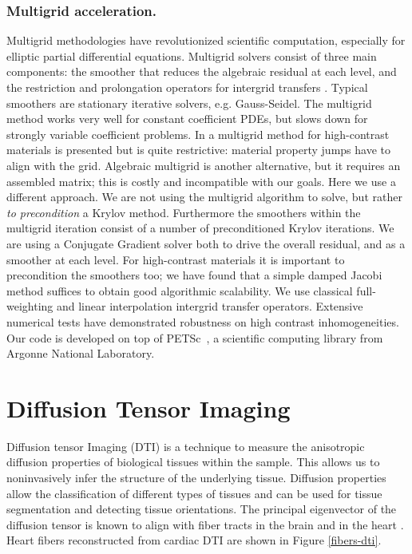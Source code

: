 \subsubsection{Multigrid acceleration.} Multigrid methodologies have revolutionized scientific computation, especially for elliptic partial differential equations. Multigrid solvers consist of three main components: the smoother that reduces the algebraic residual at each level, and the restriction and prolongation operators for intergrid transfers \cite{brandt-77}. Typical smoothers are stationary iterative solvers, e.g. Gauss-Seidel. The multigrid method works very well for constant coefficient PDEs, but slows down for strongly variable coefficient problems.  In \cite{alcouffe-brandt-etal-81} a multigrid method for high-contrast materials is presented but is quite restrictive: material property jumps have to align with the grid. Algebraic multigrid is another alternative, but it requires an assembled matrix; this is costly and incompatible with our goals. Here we use a different approach. We are not using the multigrid algorithm to solve, but rather {\em to precondition} a Krylov method. Furthermore the smoothers within the multigrid iteration consist of a number of preconditioned Krylov iterations. We are using a Conjugate Gradient solver both to drive the overall residual, and as a smoother at each level. For high-contrast materials it is important to precondition the smoothers too; we have found that a simple damped Jacobi method suffices to obtain good algorithmic scalability. We use classical full-weighting and linear interpolation intergrid transfer operators. Extensive numerical tests have demonstrated robustness on high contrast inhomogeneities.  Our code is developed on top of PETSc~\cite{petsc-home-page}, a scientific computing library from Argonne National Laboratory.	

\section{Diffusion Tensor Imaging}

Diffusion tensor Imaging (DTI) is a technique to measure the anisotropic diffusion properties of biological tissues within the sample. This allows us to noninvasively infer the structure of the underlying tissue. Diffusion properties allow the classification of different types of tissues and can be used for tissue segmentation and detecting tissue orientations. The principal eigenvector of the diffusion tensor is known to align with fiber tracts in the brain \cite{pierpaoli96} and in the heart \cite{scollan98}. Heart fibers reconstructed from cardiac DTI are shown in Figure \ref{fibers-dti}.

